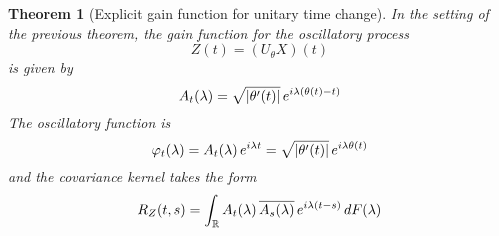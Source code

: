 \documentclass{article}
\newtheorem{theorem}{Theorem}
\begin{document}
\begin{theorem}
  [Explicit gain function for unitary time change] In the setting of the
  previous theorem, the gain function for the oscillatory process
  \begin{equation}
    Z (t) = (U_{\theta} X) (t)
  \end{equation}
  is given by
  \begin{equation}
    A_t (\lambda) = \sqrt{| \theta' (t) |}  \hspace{0.17em} e^{i \lambda
    (\theta (t) - t)}
  \end{equation}
  The oscillatory function is
  \begin{equation}
    \varphi_t (\lambda) = A_t (\lambda)  \hspace{0.17em} e^{i \lambda t} =
    \sqrt{| \theta' (t) |}  \hspace{0.17em} e^{i \lambda \theta (t)}
  \end{equation}
  and the covariance kernel takes the form
  \begin{equation}
    R_Z (t, s) = \int_{\mathbb{R}} A_t (\lambda) \hspace{0.17em} \overline{A_s
    (\lambda)} \hspace{0.17em} e^{i \lambda (t - s)}  \hspace{0.17em} dF
    (\lambda)
  \end{equation}
\end{theorem}
\end{document}
